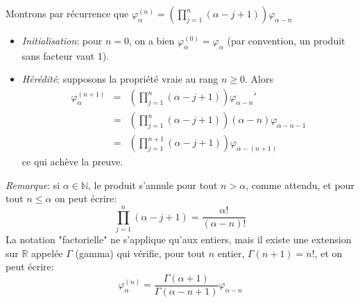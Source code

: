 Montrons par récurrence que $\varphi_{\alpha}^{(n)} = \left(\prod_{j=1}^n{(\alpha-j+1)}\right)\varphi_{\alpha-n}$
\begin{itemize}
  \item \textit{Initialisation}: pour $n=0$, on a bien $\varphi_{\alpha}^{(0)} = \varphi_{\alpha}$ (par convention, un produit sans facteur vaut 1).
  \item \textit{Hérédité}: supposons la propriété vraie au rang $n\geq 0$. Alors 
  \begin{eqnarray*}
  \varphi_{\alpha}^{(n+1)} &=& \left(\prod_{j=1}^n{(\alpha-j+1)}\right)\varphi_{\alpha-n}' \\
  &=& \left(\prod_{j=1}^n{(\alpha-j+1)}\right)(\alpha-n)\varphi_{\alpha-n-1} \\
   &=& \left(\prod_{j=1}^{n+1}{(\alpha-j+1)}\right)\varphi_{\alpha-(n+1)}
  \end{eqnarray*}
  ce qui achève la preuve.
\end{itemize}
\textit{Remarque}: si $\alpha\in\mathbb{N}$, le produit s'annule pour tout $n > \alpha$, comme attendu, et pour tout $n\leq \alpha$ on peut écrire:
\[
\prod_{j=1}^n{(\alpha-j+1)} = \frac{\alpha!}{(\alpha-n)!}
\]
La notation "factorielle" ne s'applique qu'aux entiers, mais il existe une extension sur $\mathbb{R}$ appelée $\Gamma$ (gamma) qui vérifie, pour tout $n$ entier, $\Gamma(n+1)=n!$, et on peut écrire:
\[
\varphi_{\alpha}^{(n)} = \frac{\Gamma(\alpha+1)}{\Gamma(\alpha-n+1)}\varphi_{\alpha-n}
\]
